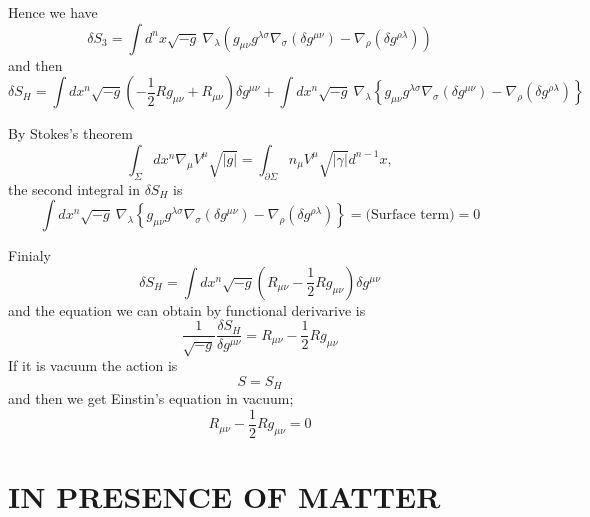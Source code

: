 \documentclass{article}
\theoremstyle{definition}
\begin{document}
Hence we have 
\begin{equation}
    \delta S_3 = \int d^n x \sqrt{-g} \ \nabla_\lambda \left( g_{\mu\nu} g^{\lambda\sigma} \nabla_\sigma (\delta g^{\mu\nu}) - \nabla_\rho (\delta g^{\rho \lambda})    \right)
\end{equation}
and then
\begin{equation}
    \delta S_H = \int dx^n \sqrt{-g} \left( - \frac{1}{2}R g_{\mu\nu} + R_{\mu\nu} \right) \delta g^{\mu\nu}  + \int dx^n \sqrt{-g} \ \nabla_\lambda \left\{ g_{\mu\nu} g^{\lambda\sigma} \nabla_\sigma (\delta g^{\mu\nu}) - \nabla_\rho (\delta g^{\rho \lambda})    \right\} 
\end{equation}

By Stokes's theorem
\begin{equation}
    \int_\Sigma dx^n \nabla_\mu V^\mu \sqrt{|g|} = \int_{\partial\Sigma} n_\mu V^\mu \sqrt{|\gamma|} d^{n-1} x,
\end{equation}
the second integral in $\delta S_H$ is
\begin{equation}
    \int dx^n \sqrt{-g} \ \nabla_\lambda \left\{ g_{\mu\nu} g^{\lambda\sigma} \nabla_\sigma (\delta g^{\mu\nu}) - \nabla_\rho (\delta g^{\rho \lambda})    \right\} = \text{(Surface  term)} = 0
\end{equation}

Finialy
\begin{equation}
    \delta S_H = \int dx^n \sqrt{-g} \left( R_{\mu\nu} - \frac{1}{2} R g_{\mu\nu} \right) \delta g^{\mu\nu}
\end{equation}
and the equation we can obtain by functional derivarive is
\begin{equation}
    \frac{1}{\sqrt{-g}} \frac{\delta S_H}{\delta g^{\mu\nu}} = R_{\mu\nu} - \frac{1}{2} R g_{\mu\nu} 
\end{equation}
If it is vacuum the action is
\begin{equation}
    S = S_H
\end{equation}
and then we get Einstin's equation in vacuum;
\begin{equation}
R_{\mu\nu} - \frac{1}{2} R g_{\mu\nu} = 0
\end{equation}

\section{IN PRESENCE OF MATTER}
\end{document}

